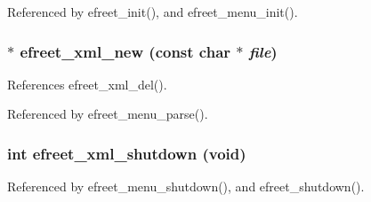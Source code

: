 Referenced by efreet\_\-init(), and efreet\_\-menu\_\-init().
\subsubsection{$\ast$ efreet\_\-xml\_\-new (const char $\ast$ {\em file})}\label{efreet__xml_8c_4d2285311849adcc65e6988fd99aa697}




References efreet\_\-xml\_\-del().

Referenced by efreet\_\-menu\_\-parse().
\subsubsection{\setlength{\rightskip}{0pt plus 5cm}int efreet\_\-xml\_\-shutdown (void)}\label{efreet__xml_8c_b23f8e3a7d790c153a0612d54967e6a3}




Referenced by efreet\_\-menu\_\-shutdown(), and efreet\_\-shutdown().